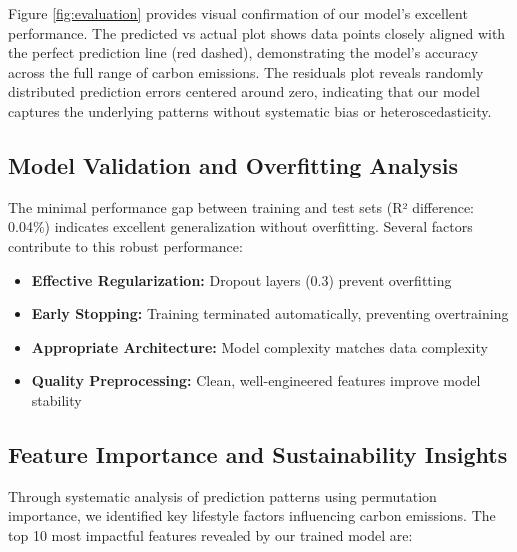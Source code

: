 \documentclass[12pt,a4paper]{article}
\begin{document}
Figure \ref{fig:evaluation} provides visual confirmation of our model's excellent performance. The predicted vs actual plot shows data points closely aligned with the perfect prediction line (red dashed), demonstrating the model's accuracy across the full range of carbon emissions. The residuals plot reveals randomly distributed prediction errors centered around zero, indicating that our model captures the underlying patterns without systematic bias or heteroscedasticity.

\subsection{Model Validation and Overfitting Analysis}

The minimal performance gap between training and test sets (R² difference: 0.04\%) indicates excellent generalization without overfitting. Several factors contribute to this robust performance:

\begin{itemize}
    \item \textbf{Effective Regularization:} Dropout layers (0.3) prevent overfitting
    \item \textbf{Early Stopping:} Training terminated automatically, preventing overtraining
    \item \textbf{Appropriate Architecture:} Model complexity matches data complexity
    \item \textbf{Quality Preprocessing:} Clean, well-engineered features improve model stability
\end{itemize}

\subsection{Feature Importance and Sustainability Insights}

Through systematic analysis of prediction patterns using permutation importance, we identified key lifestyle factors influencing carbon emissions. The top 10 most impactful features revealed by our trained model are:
\end{document}
